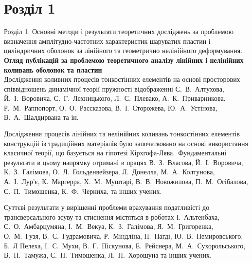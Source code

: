 \documentclass[8pt]{beamer}
\numberwithin{figure}{section}
\numberwithin{equation}{section}
\numberwithin{table}{section}
\begin{document}
\section{Розділ 1}

\begin{frame}{Розділ 1. Основні методи і результати теоретичних досліджень за проблемою визначення  амплітудно-частотних характеристик шаруватих пластин і циліндричних оболонок за лінійного та геометрично нелінійного деформування.}
\textbf{Огляд публікацій за проблемою теоретичного аналізу лінійних і нелінійних коливань оболонок та пластин}\\[3mm]
\indent 
Дослідження коливних процесів тонкостінних елементів на основі просторових співвідношень динамічної теорії пружності відображенні Є.~В.~Алтухова, Й.~І.~Воровича, С.~Г.~Лехницького, Л.~С.~Плевако, А.~К.~Приварникова, Р.~М.~Раппопорт, О.~О.~Рассказова, В.~І.~Сторожева, Ю.~А.~Устінова, В.~А.~Шалдирвана та ін.

\medskip 
Дослідження процесів лінійних та нелінійних коливань тонкостінних елементів конструкцій із традиційних матеріалів було започатковано на основі використання класичної теорії, що базується на гіпотезі Кірхгофа-Лява.~Фундаментальні результати в цьому напрямку отримані в працях В.~З.~Власова, Й.~І.~Воровича, К.~З.~Галімова, О.~Л.~Гольденвейзера, Л.~Донелла, М.~А.~Колтунова, А.~І.~Лур’є, К.~Маргерра, Х.~М.~Муштарі, В.~В.~Новожилова, П.~М.~Огібалова, С.~П.~Тимошенка, К.~Ф.~Черниха, та інших учених.~

\medskip Суттєві результати у вирішенні проблеми врахування податливісті до трансверсального зсуву та стиснення містяться в роботах І.~Альтенбаха, С.~О.~Амбарцумяна, І.~М.~Векуа, К.~З.~Галімова, Я.~М.~Григоренка, О.~М.~Гузя, В.~С.~Гудрамовича, Р.~Міндліна, П.~Нагді, Ю.~В.~Немировського, Б.~Л Пелеха, І.~С.~Мухи, В.~Г.~Піскунова, Е.~Рейснера, М.~А.~Сухорольського, В.~П.~Тамужа, С.~П.~Тимошенка, Л.~П.~Хорошуна та інших учених.
\end{frame}
\end{document}
